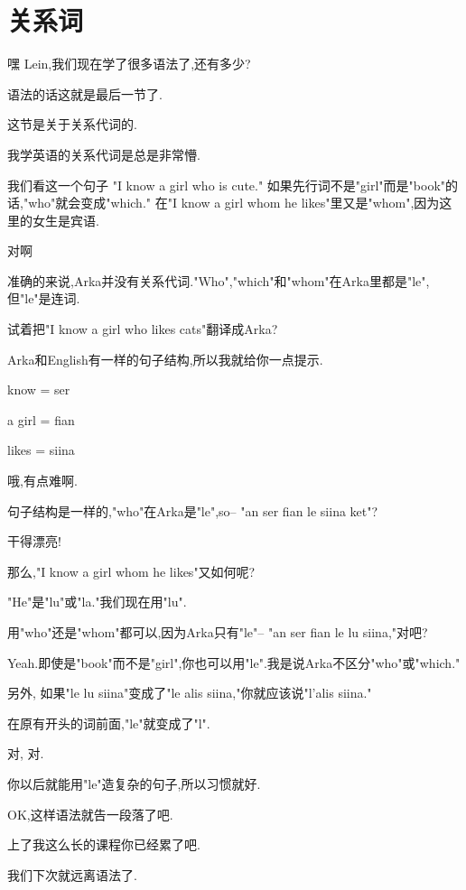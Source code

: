 \chapter[关系词]{关系词}

嘿 Lein,我们现在学了很多语法了,还有多少?


语法的话这就是最后一节了.

这节是关于关系代词的.


我学英语的关系代词是总是非常懵.

我们看这一个句子 "I know a girl who is cute."
如果先行词不是"girl"而是"book"的话,"who"就会变成"which."
在"I know a girl whom he likes"里又是"whom",因为这里的女生是宾语.


对啊

准确的来说,Arka并没有关系代词."Who","which"和"whom"在Arka里都是"le",但"le"是连词.

试着把"I know a girl who likes cats"翻译成Arka?

Arka和English有一样的句子结构,所以我就给你一点提示.

know = ser

a girl = fian

likes = siina



哦,有点难啊.

句子结构是一样的,"who"在Arka是"le",so--
"an ser fian le siina ket"?


干得漂亮!

那么,"I know a girl whom he likes"又如何呢?


"He"是"lu"或"la."我们现在用"lu".

用"who"还是"whom"都可以,因为Arka只有"le"--
"an ser fian le lu siina,"对吧?


Yeah.即使是"book"而不是"girl",你也可以用"le".我是说Arka不区分"who"或"which."

另外, 如果"le lu siina"变成了"le alis siina,"你就应该说"l'alis siina."


在原有开头的词前面,"le"就变成了"l".


对, 对.

你以后就能用"le"造复杂的句子,所以习惯就好.


OK,这样语法就告一段落了吧.


上了我这么长的课程你已经累了吧.

我们下次就远离语法了.




